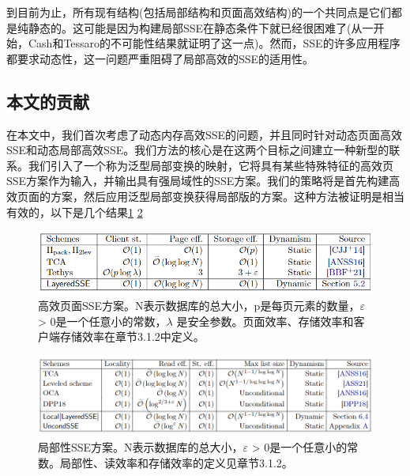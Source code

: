 \documentclass[UTF8]{article}
\begin{document}
到目前为止，所有现有结构(包括局部结构和页面高效结构)的一个共同点是它们都是纯静态的。这可能是因为构建局部SSE在静态条件下就已经很困难了(从一开始，Cash和Tessaro的不可能性结果就证明了这一点\cite{DavidCash2014TheLO})。然而，SSE的许多应用程序都要求动态性，这一问题严重阻碍了局部高效的SSE的适用性。
\subsection{本文的贡献}
在本文中，我们首次考虑了动态内存高效SSE的问题，并且同时针对动态页面高效SSE和动态局部高效SSE。我们方法的核心是在这两个目标之间建立一种新型的联系。我们引入了一个称为泛型局部变换的映射，它将具有某些特殊特征的高效页SSE方案作为输入，并输出具有强局域性的SSE方案。我们的策略将是首先构建高效页面的方案，然后应用泛型局部变换获得局部版的方案。这种方法被证明是相当有效的，以下是几个结果\ref{table1} \ref{table2}
\begin{figure}[ht]
  \centering
  \includegraphics[scale=0.5]{table1.png}
  \caption{高效页面SSE方案。N表示数据库的总大小，p是每页元素的数量，$\varepsilon$ > 0是一个任意小的常数，$\lambda$ 是安全参数。页面效率、存储效率和客户端存储效率在章节3.1.2中定义。}
  \label{table1}
\end{figure}

\begin{figure}[ht]
  \centering
  \includegraphics[scale=0.4]{table2.png}
  \caption{局部性SSE方案。N表示数据库的总大小，$\varepsilon$ > 0是一个任意小的常数。局部性、读效率和存储效率的定义见章节3.1.2。}
  \label{table2} %
\end{figure}
\end{document}
